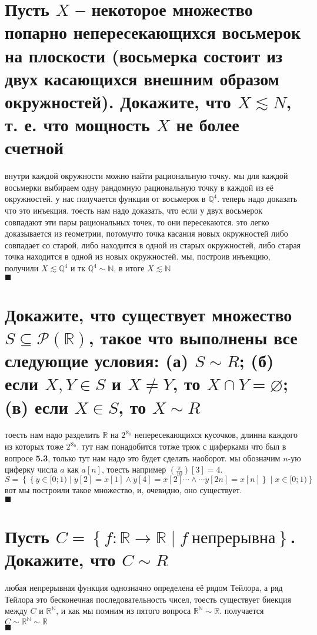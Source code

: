 \documentclass{article}
\newcommand{\ds}{\displaystyle}
\newcommand{\N}{\mathbb{N}}
\newcommand{\Q}{\mathbb{Q}}
\newcommand{\R}{\mathbb{R}}
\newcommand{\Aleph}{2^{\aleph_0}}
\renewcommand{\f}{\frac}
\renewcommand{\l}{\left}
\renewcommand{\r}{\right}
\renewcommand{\P}[1]{\mathcal{P}\l(#1\r)}
\renewcommand{\emptyset}{\varnothing}
\begin{document}
  \section{Пусть $X$ -- некоторое множество попарно непересекающихся восьмерок на плоскости (восьмерка состоит из двух касающихся внешним образом окружностей). Докажите, что $X \lesssim N$, т. е. что мощность $X$ не более счетной}
  внутри каждой окружности можно найти рациональную точку.
  мы для каждой восьмерки выбираем одну рандомную рациональную точку в каждой из её окружностей.
  у нас получается функция от восьмерок в $\Q^4$. теперь надо доказать что это инъекция.
  тоесть нам надо доказать, что если у двух восьмерок совпадают эти пары рациональных точек, то они пересекаются.
  это легко доказывается из геометрии,
  потомучто точка касания новых окружностей либо совпадает со старой,
  либо находится в одной из старых окружностей,
  либо старая точка находится в одной из новых окружностей.
  мы, построив инъекцию, получили $X \lesssim \Q^4$ и тк $\Q^4 \sim \N$, в итоге $X \lesssim \N$ \\
  $\blacksquare$

  \section{Докажите, что существует множество $S \subseteq \P{\R}$, такое что выполнены все следующие условия: (а) $S \sim R$; (б) если $X, Y \in S$ и $X \neq Y$, то $X \cap Y = \emptyset$; (в) если $X \in S$, то $X \sim R$}
  тоесть нам надо разделить $\R$ на $\Aleph$ непересекающихся кусочков, длинна каждого из которых тоже $\Aleph$.
  тут нам понадобится тотже трюк с циферками что был в вопросе \textbf{5.3}, только тут нам надо это будет сделать наоборот.
  мы обозначим $n$-ую циферку числа $a$ как $a\l[n\r]$, тоесть например $\l(\f{\pi}{10}\r)\l[3\r] = 4$. \\
  $\ds S = \l\{ \l\{ y \in [0;1) \mid y[2] = x[1] \land y[4] = x[2] \cdots\land\cdots y[2n] = x[n] \r\} \mid x \in [0;1) \r\}$ \\
  вот мы построили такое множество, и, очевидно, оно существует. \\
  $\blacksquare$

  \section{Пусть $C = \l\{f: \R \to \R \mid f \ \text{непрерывна} \r\}$. Докажите, что $C \sim R$}
  любая непрерывная функция однозначно определена её рядом Тейлора, а ряд Тейлора это бесконечная последовательность чисел,
  тоесть существует биекция между $C$ и $\R^\N$, и как мы помним из пятого вопроса $\R^\N \sim \R$.
  получается $C \sim \R^\N \sim \R$ \\
  $\blacksquare$
\end{document}
